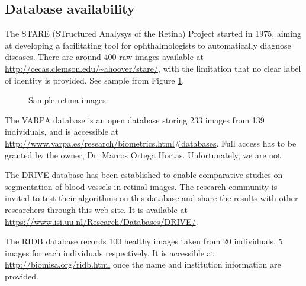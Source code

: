\documentclass[a4paper,11pt]{article}
\theoremstyle{plain} %
\begin{document}
\subsection{Database availability}

The STARE (STructured Analysys of the Retina) Project started in 1975, aiming at developing a facilitating tool for ophthalmologists to automatically diagnose diseases. There are around 400 raw images available at \url{http://cecas.clemson.edu/~ahoover/stare/}, with the limitation that no clear label of identity is provided. See sample from Figure \ref{fig}.

\begin{figure}
	\centering
	\quad
	\quad
	\caption{Sample retina images.}
	\label{fig}
\end{figure}


The VARPA database is an open database storing 233 images from 139 individuals, and is accessible at \url{http://www.varpa.es/research/biometrics.html#databases}. Full access has to be granted by the owner, Dr. Marcos Ortega Hortas. Unfortunately, we are not.

The DRIVE database has been established to enable comparative studies on segmentation of blood vessels in retinal images. The research community is invited to test their algorithms on this database and share the results with other researchers through this web site. It is available at \url{https://www.isi.uu.nl/Research/Databases/DRIVE/}.


The RIDB database records 100 healthy images taken from 20 individuals, 5 images for each individuals respectively. It is accessible at \url{http://biomisa.org/ridb.html} once the name and institution information are provided. 
\end{document}
